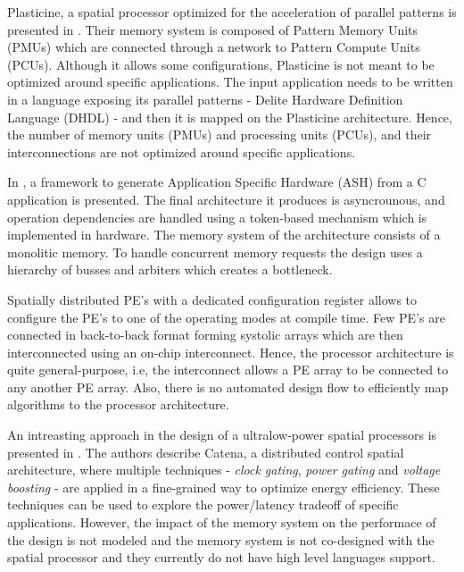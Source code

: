 Plasticine, a spatial processor optimized for the acceleration of parallel patterns is presented in \cite{prabhakar2017plasticine}. Their memory system is composed of Pattern Memory Units (PMUs) which are connected through a network to Pattern Compute Units (PCUs). Although it allows some configurations, Plasticine is not meant to be optimized around specific applications. The input application needs to be written in a language exposing its parallel patterns - Delite Hardware Definition Language (DHDL) - and then it is mapped on the Plasticine architecture. Hence, the number of memory units (PMUs) and processing units (PCUs), and their interconnections are not optimized around specific applications.

In \cite{budiu2004spatial}, a framework to generate Application Specific Hardware (ASH) from a C application is presented. The final architecture it produces is asyncrounous, and operation dependencies are handled using a token-based mechanism which is implemented in hardware. The memory system of the architecture consists of a monolitic memory. To handle concurrent memory requests the design uses a hierarchy of busses and arbiters which creates a bottleneck.

Spatially distributed PE's with a dedicated configuration register allows to configure the PE's to one of the operating modes \cite{streamproc2019} at compile time. Few PE's are connected in back-to-back format forming systolic arrays which are then interconnected using an on-chip interconnect. Hence, the processor architecture is quite general-purpose, i.e, the interconnect allows a PE array to be connected to any another PE array. Also, there is no automated design flow to efficiently map algorithms to the processor architecture.

An intreasting approach in the design of a ultralow-power spatial processors is presented in \cite{cerqueira2020catena}. The authors describe Catena, a distributed control spatial architecture, where multiple techniques - \textit{clock gating}, \textit{power gating} and \textit{voltage boosting} - are applied in a fine-grained way to optimize energy efficiency. These techniques can be used to explore the power/latency tradeoff of specific applications. However, the impact of the memory system on the performace of the design is not modeled and the memory system is not co-designed with the spatial processor and they currently do not have high level languages support.
